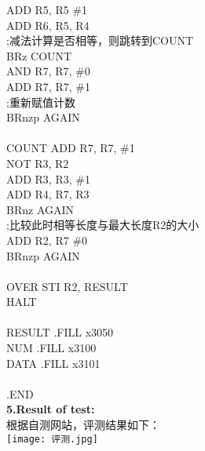 \documentclass[12pt]{ctexart}
\begin{document}
\hspace*{1.5cm}ADD R5, R5 \#1\\
\hspace*{1.5cm}ADD R6, R5, R4\\
\hspace*{1.5cm};减法计算是否相等，则跳转到COUNT\\
\hspace*{1.5cm}BRz COUNT\\
\hspace*{1.5cm}AND R7, R7, \#0\\
\hspace*{1.5cm}ADD R7, R7, \#1\\
\hspace*{1.5cm};重新赋值计数\\
\hspace*{1.5cm}BRnzp AGAIN\\
\\
COUNT   ADD R7, R7, \#1\\
\hspace*{1.5cm}NOT R3, R2\\
\hspace*{1.5cm}ADD R3, R3, \#1\\
\hspace*{1.5cm}ADD R4, R7, R3\\
\hspace*{1.5cm}BRnz AGAIN\\
\hspace*{1.5cm};比较此时相等长度与最大长度R2的大小\\
\hspace*{1.5cm}ADD R2, R7 \#0\\
\hspace*{1.5cm}BRnzp AGAIN\\
\\
OVER    STI R2, RESULT\\
\hspace*{1.5cm}HALT\\
\\
RESULT .FILL x3050\\
NUM .FILL x3100\\
DATA .FILL x3101\\
\\
.END\\
{\bf5.Result of test:}\\
根据自测网站，评测结果如下：\\
\texttt{[image: 评测.jpg]}\\
\end{document}
